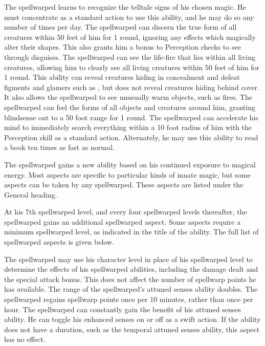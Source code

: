  The spellwarped learns to recognize the telltale signs of his chosen magic. He must concentrate as a standard action to use this ability, and he may do so any number of times per day.
 The spellwarped can discern the true form of all creatures within 50 feet of him for 1 round, ignoring any effects which magically alter their shapes. This also grants him a  bonus to Perception checks to see through disguises.
 The spellwarped can see the life-fire that lies within all living creatures, allowing him to clearly see all living creatures within 50 feet of him for 1 round. This ability can reveal creatures hiding in concealment and defeat figments and glamers such as , but does not reveal creatures hiding behind cover. It also allows the spellwarped to see unusually warm objects, such as fires.
 The spellwarped can feel the forms of all objects and creatures around him, granting blindsense out to a 50 foot range for 1 round.
 The spellwarped can accelerate his mind to immediately search everything within a 10 foot radius of him with the Perception skill as a standard action. Alternately, he may use this ability to read a book ten times as fast as normal.

 The spellwarped gains a new ability based on his continued exposure to magical energy. Most aspects are specific to particular kinds of innate magic, but some aspects can be taken by any spellwarped. These aspects are listed under the General heading.

At his 7th spellwarped level, and every four spellwarped levels thereafter, the spellwarped gains an additional spellwarped aspect. Some aspects require a minimum spellwarped level, as indicated in the title of the ability. The full list of spellwarped aspects is given below.

 The spellwarped may use his character level in place of his spellwarped level to determine the effects of his spellwarped abilities, including the damage dealt and the special attack bonus. This does not affect the number of spellwarp points he has available.
 The range of the spellwarped's attuned senses ability doubles.
 The spellwarped regains spellwarp points once per 10 minutes, rather than once per hour.
 The spellwarped can constantly gain the benefit of his attuned senses ability. He can toggle his enhanced senses on or off as a swift action. If the ability does not have a duration, such as the temporal attuned senses ability, this aspect has no effect.

